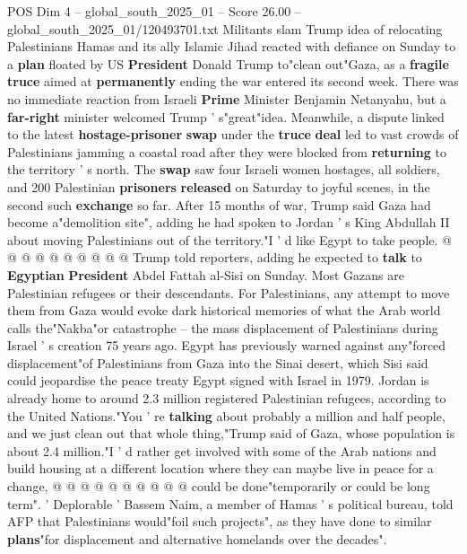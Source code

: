 \begin{textsample}{POS Dim 4 – global\_south\_2025\_01 – Score 26.00 – global\_south\_2025\_01/120493701.txt}  \label{ex:f4_pos_015}
Militants slam Trump idea of relocating Palestinians Hamas and its ally Islamic Jihad reacted with defiance on Sunday to a \textbf{plan} floated by US \textbf{President} Donald Trump to"clean out"Gaza, as a \textbf{fragile} \textbf{truce} aimed at \textbf{permanently} ending the war entered its second week.
There was no immediate reaction from Israeli \textbf{Prime} Minister Benjamin Netanyahu, but a \textbf{far-right} minister welcomed Trump ' s"great"idea.
Meanwhile, a dispute linked to the latest \textbf{hostage-prisoner} \textbf{swap} under the \textbf{truce} \textbf{deal} led to vast crowds of Palestinians jamming a coastal road after they were blocked from \textbf{returning} to the territory ' s north.
The \textbf{swap} saw four Israeli women hostages, all soldiers, and 200 Palestinian \textbf{prisoners} \textbf{released} on Saturday to joyful scenes, in the second such \textbf{exchange} so far.
After 15 months of war, Trump said Gaza had become a"demolition site", adding he had spoken to Jordan ' s King Abdullah II about moving Palestinians out of the territory."I ' d like Egypt to take people. @ @ @ @ @ @ @ @ @ @ Trump told reporters, adding he expected to \textbf{talk} to \textbf{Egyptian} \textbf{President} Abdel Fattah al-Sisi on Sunday.
Most Gazans are Palestinian refugees or their descendants.
For Palestinians, any attempt to move them from Gaza would evoke dark historical memories of what the Arab world calls the"Nakba"or catastrophe -- the mass displacement of Palestinians during Israel ' s creation 75 years ago.
Egypt has previously warned against any"forced displacement"of Palestinians from Gaza into the Sinai desert, which Sisi said could jeopardise the peace treaty Egypt signed with Israel in 1979.
Jordan is already home to around 2.3 million registered Palestinian refugees, according to the United Nations."You ' re \textbf{talking} about probably a million and half people, and we just clean out that whole thing,"Trump said of Gaza, whose population is about 2.4 million."I ' d rather get involved with some of the Arab nations and build housing at a different location where they can maybe live in peace for a change, @ @ @ @ @ @ @ @ @ @ could be done"temporarily or could be long term". ' Deplorable ' Bassem Naim, a member of Hamas ' s political bureau, told AFP that Palestinians would"foil such projects", as they have done to similar \textbf{plans}"for displacement and alternative homelands over the decades".

\end{textsample}
